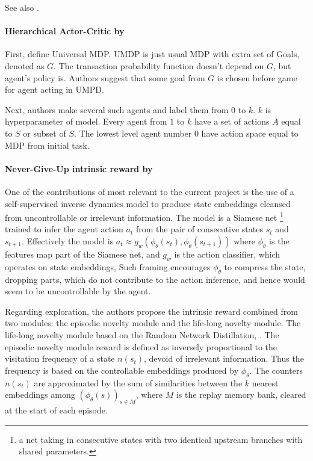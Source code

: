 \documentclass[acmsmall, nonacm]{acmart}
\begin{document}
See also \citep{watter_embed_2015}.


\paragraph{Hierarchical Actor-Critic by~\citet{levy2017learning}} %
\label{par:hierarchical_ac}

First, define Universal MDP. UMDP is just usual MDP with extra set of Goals, denoted as $G$. The transaction probability function doesn't depend on $G$, but agent's policy is. Authors suggest that some goal from $G$ is chosen before game for agent acting in UMPD.

Next, authors make several such agents and label them from $0$ to $k$. $k$ is hyperparameter of model. Every agent from $1$ to $k$ have a set of actions $A$ equal to $S$ or subset of $S$. The lowest level agent number $0$ have action space equal to MDP from initial task.


\paragraph{Never-Give-Up intrinsic reward by~\citet{badia_never_2020}} %
\label{par:never_give_up}

One of the contributions of most relevant to the current project is the use of a self-supervised inverse dynamics model to produce state embeddings cleansed from uncontrollable or irrelevant information.
%
The model is a Siamese net%
\footnote{
    a net taking in consecutive states with two identical upstream branches with shared parameters.
}
trained to infer the agent action $a_t$ from the pair of consecutive states $s_t$ and $s_{t+1}$. Effectively the model is $
    a_t \approx g_w(\phi_\theta(s_t), \phi_\theta(s_{t+1}))
$ where $\phi_\theta$ is the features map part of the Siamese net, and $g_w$ is the action classifier, which operates on state embeddings, Such framing encourages $\phi_\theta$ to compress the state, dropping parts, which do not contribute to the action inference, and hence would seem to be uncontrollable by the agent.

Regarding exploration, the authors propose the intrinsic reward combined from two modules: the episodic novelty module and the life-long novelty module.
%
The life-long novelty module based on the Random Network Distillation, \citep{burda_exploration_2019}.
%
The episodic novelty module reward is defined as inversely proportional to the visitation frequency of a state $n(s_t)$, devoid of irrelevant information. Thus the frequency is based on the controllable embeddings produced by $\phi_\theta$.
The counters $n(s_t)$ are approximated by the sum of similarities between the $k$ nearest embeddings among  $(\phi_\theta(s))_{s\in M}$, where $M$ is the replay memory bank, cleared at the start of each episode.
\end{document}
